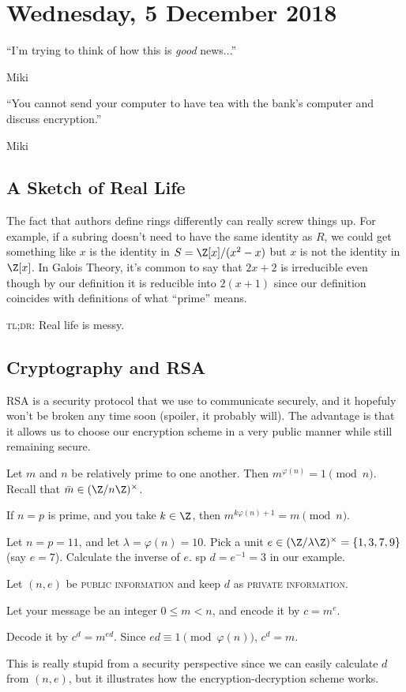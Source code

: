 \section{Wednesday, 5 December 2018}

\epigraph{``I'm trying to think of how this is \emph{good} news...''}{Miki}

\epigraph{``You cannot send your computer to have tea with the bank's computer and discuss encryption.''}{Miki}

\subsection{A Sketch of Real Life}
The fact that authors define rings differently can really screw things up. For example, if a subring doesn't need to have the same identity as $R$, we could get something like $x$ is the identity in $S = \Z[x]/(x^2-x)$ but $x$ is not the identity in $\Z[x]$. In Galois Theory, it's common to say that $2x+2$ is irreducible even though by our definition it is reducible into $2(x+1)$ since our definition coincides with definitions of what ``prime'' means. 

\textsc{tl;dr:} Real life is messy. 

\subsection{Cryptography and RSA}

RSA is a security protocol that we use to communicate securely, and it hopefuly won't be broken any time soon (spoiler, it probably will). The advantage is that it allows us to choose our encryption scheme in a very public manner while still remaining secure.

\begin{theorem}
Let $m$ and $n$ be relatively prime to one another. Then $m^{\varphi(n)} = 1 \pmod{n}$. Recall that $\bar{m} \in (\Z/n\Z)^\times$.
\end{theorem}

\begin{proposition}
If $n = p$ is prime, and you take $k \in \Z$, then $m^{k\varphi(n) + 1} = m \pmod{n}$.
\end{proposition}

\begin{example}
Let $n = p = 11$, and let $\lambda = \varphi(n) = 10$. Pick a unit $e \in (\Z/\lambda\Z)^\times = \{1,3,7,9\}$ (say $e = 7$). Calculate the inverse of $e$. sp $d = e^{-1} = 3$ in our example.

\noindent
Let $(n,e)$ be \textsc{public information} and keep $d$ as \textsc{private information}.

\noindent
Let your message be an integer $0 \leq m < n$, and encode it by $c = m^e$.

\noindent
Decode it by $c^d = m^{ed}$. Since $ed \equiv 1 \pmod{\varphi(n)}$, $c^d = m$.

\noindent
This is really stupid from a security perspective since we can easily calculate $d$ from $(n,e)$, but it illustrates how the encryption-decryption scheme works.
\end{example}

